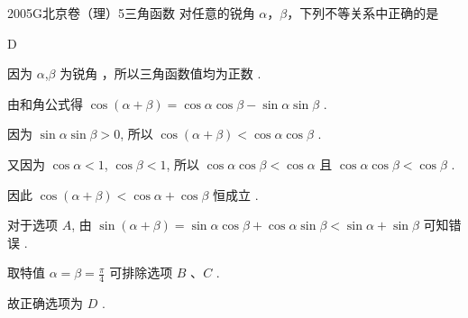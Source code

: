 
\begin{problem}{2005}{G}{北京卷（理）}{5}{三角函数}
对任意的锐角 $ \alpha $，$ \beta $，下列不等关系中正确的是
\begin{choices}
\choice{{ $ \sin(\alpha+\beta)>\sin\alpha+\sin\beta $ }}
\choice{{ $ \sin(\alpha+\beta)>\cos\alpha+\cos\beta $ }}
\choice{{ $ \cos(\alpha+\beta)<\sin\alpha+\sin\beta $ }}
\choice{{ $ \cos(\alpha+\beta)<\cos\alpha+\cos\beta $ }}
\end{choices}
\end{problem}

\begin{answer}
D
\end{answer}

\begin{solutions}
因为 $\alpha$,$\beta$ 为锐角 ，所以三角函数值均为正数 .

由和角公式得 $\cos(\alpha+\beta) = \cos\alpha\cos\beta - \sin\alpha\sin\beta$ .

因为 $\sin\alpha\sin\beta > 0$, 所以 $\cos(\alpha+\beta) < \cos\alpha\cos\beta$ .

又因为 $\cos\alpha < 1$, $\cos\beta < 1$, 所以 $\cos\alpha\cos\beta < \cos\alpha$ 且 $\cos\alpha\cos\beta < \cos\beta$ .

因此 $\cos(\alpha+\beta) < \cos\alpha + \cos\beta$ 恒成立 .

对于选项 $A$, 由 $\sin(\alpha+\beta) = \sin\alpha\cos\beta + \cos\alpha\sin\beta < \sin\alpha + \sin\beta$ 可知错误 .

取特值 $\alpha = \beta = \displaystyle \frac{\pi}{4}$ 可排除选项 $B$ 、$C$ .

故正确选项为 $D$ .
\end{solutions}